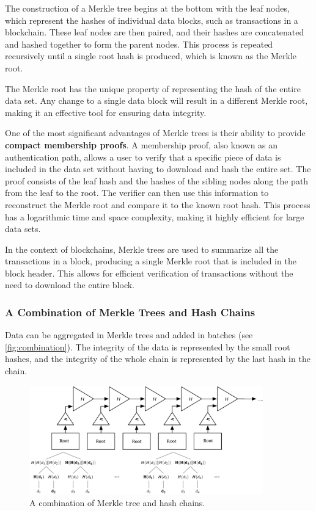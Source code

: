The construction of a Merkle tree begins at the bottom with the leaf
nodes, which represent the hashes of individual data blocks, such as
transactions in a blockchain. These leaf nodes are then paired, and
their hashes are concatenated and hashed together to form the parent
nodes. This process is repeated recursively until a single root hash is
produced, which is known as the Merkle root.

The Merkle root has the unique property of representing the hash of the
entire data set. Any change to a single data block will result in a
different Merkle root, making it an effective tool for ensuring data
integrity.

One of the most significant advantages of Merkle trees is their ability
to provide \textbf{compact membership proofs}. A membership proof, also
known as an authentication path, allows a user to verify that a specific
piece of data is included in the data set without having to download and
hash the entire set. The proof consists of the leaf hash and the hashes
of the sibling nodes along the path from the leaf to the root. The
verifier can then use this information to reconstruct the Merkle root
and compare it to the known root hash. This process has a logarithmic
time and space complexity, making it highly efficient for large data
sets.

In the context of blockchains, Merkle trees are used to summarize all
the transactions in a block, producing a single Merkle root that is
included in the block header. This allows for efficient verification of
transactions without the need to download the entire block.

\subsubsection{A Combination of Merkle Trees and Hash Chains}\label{a-combination-of-merkle-trees-and-hash-chains}

Data can be aggregated in Merkle trees and added in batches (see \autoref{fig:combination}). The
integrity of the data is represented by the small root hashes, and the
integrity of the whole chain is represented by the last hash in the
chain.

\begin{figure}[t]
	\begin{center}
		\includegraphics[width=0.9\textwidth]{./figs/combination-mk-hc.png} 

		\caption{A combination of Merkle tree and hash chains.}		
		\label{fig:combination}
	\end{center}	
\end{figure}


